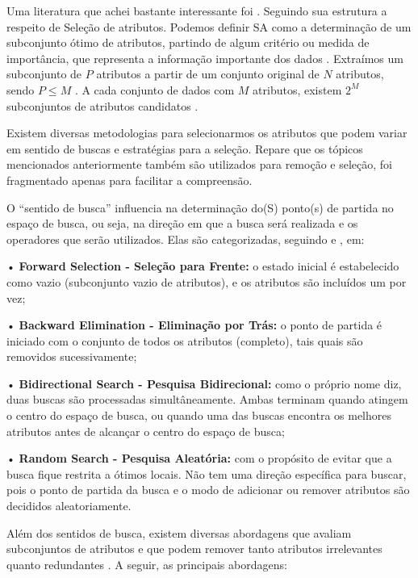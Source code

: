 \documentclass[
  openany]{book}
\begin{document}
Uma literatura que achei bastante interessante foi \citet{parmezan2012avaliaccao}. Seguindo sua estrutura a respeito de Seleção de atributos. Podemos definir SA como a determinação de um subconjunto ótimo de atributos, partindo de algum critério ou medida de importância, que representa a informação importante dos dados \citep{parmezan2012avaliaccao}. Extraímos um subconjunto de \(P\) atributos a partir de um conjunto original de \(N\) atributos, sendo \(P\leq M\) \citep{parmezan2012avaliaccao, liu1998feature, lee2005seleccao}. A cada conjunto de dados com \(M\) atributos, existem \(2^M\) subconjuntos de atributos candidatos \citep{langley1994selection}.

Existem diversas metodologias para selecionarmos os atributos que podem variar em sentido de buscas e estratégias para a seleção. Repare que os tópicos mencionados anteriormente também são utilizados para remoção e seleção, foi fragmentado apenas para facilitar a compreensão.

O ``sentido de busca'' influencia na determinação do(S) ponto(s) de partida no espaço de busca, ou seja, na direção em que a busca será realizada e os operadores que serão utilizados. Elas são categorizadas, seguindo \citet{parmezan2012avaliaccao} e \citet{liu2008computational}, em:

• \textbf{Forward Selection - Seleção para Frente:} o estado inicial é estabelecido como vazio (subconjunto vazio de atributos), e os atributos são incluídos um por vez;

• \textbf{Backward Elimination - Eliminação por Trás:} o ponto de partida é iniciado com o conjunto de todos os atributos (completo), tais quais são removidos sucessivamente;

• \textbf{Bidirectional Search - Pesquisa Bidirecional:} como o próprio nome diz, duas buscas são processadas simultâneamente. Ambas terminam quando atingem o centro do espaço de busca, ou quando uma das buscas encontra os melhores atributos antes de alcançar o centro do espaço de busca;

• \textbf{Random Search - Pesquisa Aleatória:} com o propósito de evitar que a busca fique restrita a ótimos locais. Não tem uma direção específica para buscar, pois o ponto de partida da busca e o modo de adicionar ou remover atributos são decididos aleatoriamente.

Além dos sentidos de busca, existem diversas abordagens que avaliam subconjuntos de atributos e que podem remover tanto atributos irrelevantes quanto redundantes \citep{parmezan2012avaliaccao, liu2008computational}. A seguir, as principais abordagens:
\end{document}
